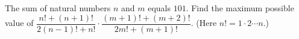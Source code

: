 The sum of natural numbers $n$ and $m$ equals $101$. Find the maximum possible value of $\dfrac{n!+(n+1)!}{2(n-1)!+n!}\cdot\dfrac{(m+1)!+(m+2)!}{2m!+(m+1)!}$. (Here $n!=1\cdot2 \cdots n$.)

